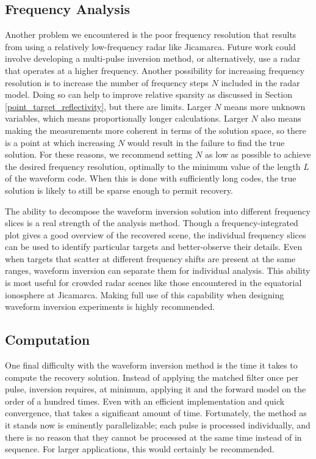 \subsection{Frequency Analysis}
Another problem we encountered is the poor frequency resolution that results from using a relatively low-frequency radar like Jicamarca. Future work could involve developing a multi-pulse inversion method, or alternatively, use a radar that operates at a higher frequency. Another possibility for increasing frequency resolution is to increase the number of frequency steps $N$ included in the radar model. Doing so can help to improve relative sparsity as discussed in Section \ref{point_target_reflectivity}, but there are limits. Larger $N$ means more unknown variables, which means proportionally longer calculations. Larger $N$ also means making the measurements more coherent in terms of the solution space, so there is a point at which increasing $N$ would result in the failure to find the true solution. For these reasons, we recommend setting $N$ as low as possible to achieve the desired frequency resolution, optimally to the minimum value of the length $L$ of the waveform code. When this is done with sufficiently long codes, the true solution is likely to still be sparse enough to permit recovery.

The ability to decompose the waveform inversion solution into different frequency slices is a real strength of the analysis method. Though a frequency-integrated plot gives a good overview of the recovered scene, the individual frequency slices can be used to identify particular targets and better-observe their details. Even when targets that scatter at different frequency shifts are present at the same ranges, waveform inversion can separate them for individual analysis. This ability is most useful for crowded radar scenes like those encountered in the equatorial ionosphere at Jicamarca. Making full use of this capability when designing waveform inversion experiments is highly recommended.

\subsection{Computation}
One final difficulty with the waveform inversion method is the time it takes to compute the recovery solution. Instead of applying the matched filter once per pulse, inversion requires, at minimum, applying it and the forward model on the order of a hundred times. Even with an efficient implementation and quick convergence, that takes a significant amount of time. Fortunately, the method as it stands now is eminently parallelizable; each pulse is processed individually, and there is no reason that they cannot be processed at the same time instead of in sequence. For larger applications, this would certainly be recommended.